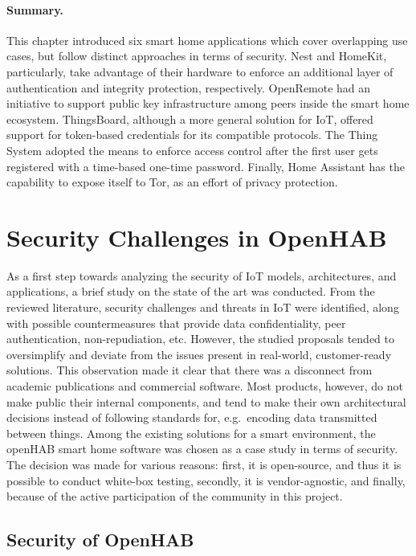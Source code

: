 \documentclass[12pt]{article}
\begin{document}
\paragraph{Summary.} This chapter introduced six smart home applications which cover overlapping use cases, but follow distinct approaches in terms of security. Nest and HomeKit, particularly, take advantage of their hardware to enforce an additional layer of authentication and integrity protection, respectively. OpenRemote had an initiative to support public key infrastructure among peers inside the smart home ecosystem. ThingsBoard, although a more general solution for IoT, offered support for token-based credentials for its compatible protocols. The Thing System adopted the means to enforce access control after the first user gets registered with a time-based one-time password. Finally, Home Assistant has the capability to expose itself to Tor, as an effort of privacy protection. 

\newpage
\section{Security Challenges in OpenHAB}
\label{sec:method}

As a first step towards analyzing the security of IoT models, architectures, and applications, a brief study on the state of the art was conducted. From the reviewed literature, security challenges and threats in IoT were identified, along with possible countermeasures that provide data confidentiality, peer authentication, non-repudiation, etc. However, the studied proposals tended to oversimplify and deviate from the issues present in real-world, customer-ready solutions. This observation made it clear that there was a disconnect from academic publications and commercial software. Most products, however, do not make public their internal components, and tend to make their own architectural decisions instead of following standards for, e.g.\ encoding data transmitted between things. Among the existing solutions for a smart environment, the openHAB smart home software was chosen as a case study in terms of security. The decision was made for various reasons: first, it is open-source, and thus it is possible to conduct white-box testing, secondly, it is vendor-agnostic, and finally, because of the active participation of the community in this project.

\subsection{Security of OpenHAB}
\end{document}
